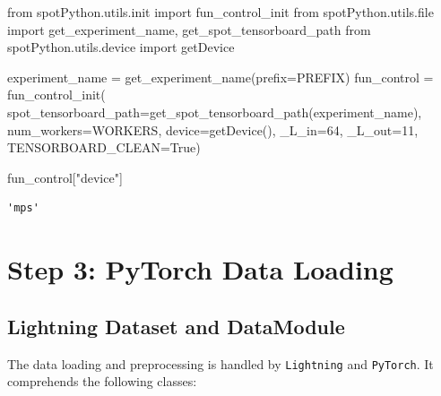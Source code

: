 \documentclass[
  letterpaper,
  DIV=11,
  numbers=noendperiod]{scrreprt}
\newenvironment{Shaded}{\begin{snugshade}}{\end{snugshade}}
\newcommand{\BuiltInTok}[1]{\textcolor[rgb]{0.00,0.23,0.31}{#1}}
\newcommand{\DecValTok}[1]{\textcolor[rgb]{0.68,0.00,0.00}{#1}}
\newcommand{\ImportTok}[1]{\textcolor[rgb]{0.00,0.46,0.62}{#1}}
\newcommand{\NormalTok}[1]{\textcolor[rgb]{0.00,0.23,0.31}{#1}}
\newcommand{\OperatorTok}[1]{\textcolor[rgb]{0.37,0.37,0.37}{#1}}
\newcommand{\StringTok}[1]{\textcolor[rgb]{0.13,0.47,0.30}{#1}}
\newcommand{\VariableTok}[1]{\textcolor[rgb]{0.07,0.07,0.07}{#1}}
\begin{document}
\begin{Shaded}
\begin{Highlighting}[]
\ImportTok{from}\NormalTok{ spotPython.utils.init }\ImportTok{import}\NormalTok{ fun\_control\_init}
\ImportTok{from}\NormalTok{ spotPython.utils.}\BuiltInTok{file} \ImportTok{import}\NormalTok{ get\_experiment\_name, get\_spot\_tensorboard\_path}
\ImportTok{from}\NormalTok{ spotPython.utils.device }\ImportTok{import}\NormalTok{ getDevice}

\NormalTok{experiment\_name }\OperatorTok{=}\NormalTok{ get\_experiment\_name(prefix}\OperatorTok{=}\NormalTok{PREFIX)}
\NormalTok{fun\_control }\OperatorTok{=}\NormalTok{ fun\_control\_init(}
\NormalTok{    spot\_tensorboard\_path}\OperatorTok{=}\NormalTok{get\_spot\_tensorboard\_path(experiment\_name),}
\NormalTok{    num\_workers}\OperatorTok{=}\NormalTok{WORKERS,}
\NormalTok{    device}\OperatorTok{=}\NormalTok{getDevice(),}
\NormalTok{    \_L\_in}\OperatorTok{=}\DecValTok{64}\NormalTok{,}
\NormalTok{    \_L\_out}\OperatorTok{=}\DecValTok{11}\NormalTok{,}
\NormalTok{    TENSORBOARD\_CLEAN}\OperatorTok{=}\VariableTok{True}\NormalTok{)}
\end{Highlighting}
\end{Shaded}

\begin{Shaded}
\begin{Highlighting}[]
\NormalTok{fun\_control[}\StringTok{"device"}\NormalTok{]}
\end{Highlighting}
\end{Shaded}

\begin{verbatim}
'mps'
\end{verbatim}

\hypertarget{sec-data-loading-31}{%
\section{Step 3: PyTorch Data Loading}\label{sec-data-loading-31}}

\hypertarget{lightning-dataset-and-datamodule}{%
\subsection{Lightning Dataset and
DataModule}\label{lightning-dataset-and-datamodule}}

The data loading and preprocessing is handled by \texttt{Lightning} and
\texttt{PyTorch}. It comprehends the following classes:
\end{document}
